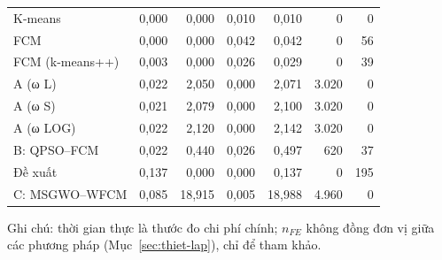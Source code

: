 {\begin{longtable}{@{}lrrrrrr@{}}
K-means & 0,000 & 0,000 & 0,010 & 0,010 & 0 & 0 \\
FCM & 0,000 & 0,000 & 0,042 & 0,042 & 0 & 56 \\
FCM (k-means++) & 0,003 & 0,000 & 0,026 & 0,029 & 0 & 39 \\
A (ω L) & 0,022 & 2,050 & 0,000 & 2,071 & 3.020 & 0 \\
A (ω S) & 0,021 & 2,079 & 0,000 & 2,100 & 3.020 & 0 \\
A (ω LOG) & 0,022 & 2,120 & 0,000 & 2,142 & 3.020 & 0 \\
B: QPSO–FCM & 0,022 & 0,440 & 0,026 & 0,497 & 620 & 37 \\
Đề xuất & 0,137 & 0,000 & 0,000 & 0,137 & 0 & 195 \\
C: MSGWO–WFCM & 0,085 & 18,915 & 0,005 & 18,988 & 4.960 & 0 \\
\end{longtable}
}
{\scriptsize\noindent Ghi chú: thời gian thực là thước đo chi phí chính; $n_{FE}$ không đồng đơn vị giữa các phương pháp (Mục~\ref{sec:thiet-lap}), chỉ để tham khảo.\par}
